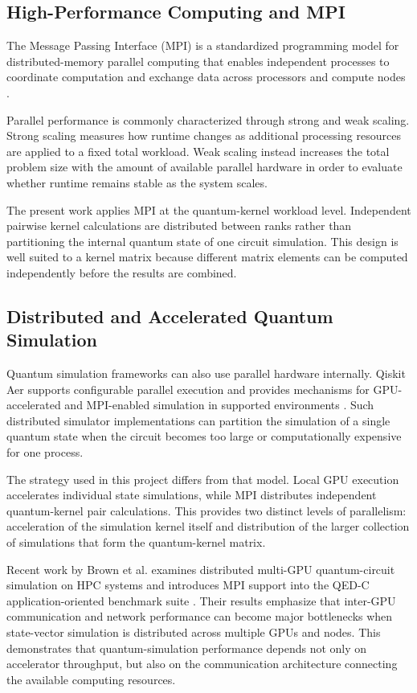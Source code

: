 \documentclass[pdflatex,sn-mathphys-num]{sn-jnl}%
\theoremstyle{thmstyleone}%
\theoremstyle{thmstyletwo}%
\theoremstyle{thmstylethree}%
\begin{document}
\subsection{High-Performance Computing and MPI}
\label{subsec:related-hpc}

The Message Passing Interface (MPI) is a standardized programming model for
distributed-memory parallel computing that enables independent processes to
coordinate computation and exchange data across processors and compute nodes
\cite{mpiforum2023,gropp2014usingmpi}.

Parallel performance is commonly characterized through strong and weak scaling.
Strong scaling measures how runtime changes as additional processing resources
are applied to a fixed total workload. Weak scaling instead increases the total
problem size with the amount of available parallel hardware in order to
evaluate whether runtime remains stable as the system scales.

The present work applies MPI at the quantum-kernel workload level. Independent
pairwise kernel calculations are distributed between ranks rather than
partitioning the internal quantum state of one circuit simulation. This design
is well suited to a kernel matrix because different matrix elements can be
computed independently before the results are combined.


\subsection{Distributed and Accelerated Quantum Simulation}
\label{subsec:related-accelerated-simulation}

Quantum simulation frameworks can also use parallel hardware internally.
Qiskit Aer supports configurable parallel execution and provides mechanisms for
GPU-accelerated and MPI-enabled simulation in supported environments
\cite{aermpi}. Such distributed simulator implementations can partition the
simulation of a single quantum state when the circuit becomes too large or
computationally expensive for one process.

The strategy used in this project differs from that model. Local GPU execution
accelerates individual state simulations, while MPI distributes independent
quantum-kernel pair calculations. This provides two distinct levels of
parallelism: acceleration of the simulation kernel itself and distribution of
the larger collection of simulations that form the quantum-kernel matrix.

Recent work by Brown et al. examines distributed multi-GPU quantum-circuit
simulation on HPC systems and introduces MPI support into the QED-C
application-oriented benchmark suite \cite{brown2026}. Their results emphasize
that inter-GPU communication and network performance can become major
bottlenecks when state-vector simulation is distributed across multiple GPUs
and nodes. This demonstrates that quantum-simulation performance depends not
only on accelerator throughput, but also on the communication architecture
connecting the available computing resources.
\end{document}
